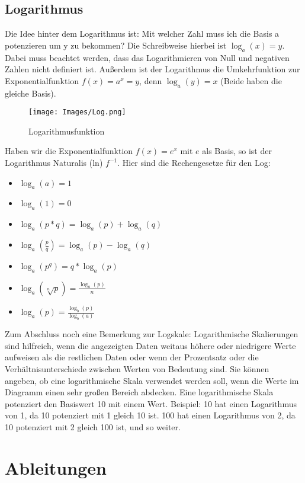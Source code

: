 \documentclass{scrreprt}
\begin{document}
\subsection{Logarithmus}\label{Logarithmus}
Die Idee hinter dem Logarithmus ist: Mit welcher Zahl muss ich die Basis a potenzieren um y zu bekommen?
Die Schreibweise hierbei ist $\log_a(x)=y$. Dabei muss beachtet werden, dass das Logarithmieren von Null und negativen Zahlen nicht definiert ist.
Außerdem ist der Logarithmus die Umkehrfunktion zur Exponentialfunktion $f(x)=a^x=y$, denn $\log_a(y)=x$ (Beide haben die gleiche Basis). 
\begin{figure}[h]
    \centering
    \texttt{[image: Images/Log.png]}
    \caption[L]{Logarithmusfunktion}
    \label{Figur 3}
\end{figure}
Haben wir die Exponentialfunktion $f(x)=e^x$ mit $e$ als Basis, so ist der Logarithmus Naturalis (ln) $f^{-1}$. Hier sind die Rechengesetze für den Log:\\
\begin{itemize}
    \item $\log_a(a)=1$
    \item $\log_a(1)=0$
    \item $\log_a(p*q)=\log_a(p)+\log_a(q)$
    \item $\log_a(\frac{p}{q})=\log_a(p)-\log_a(q)$
    \item $\log_a(p^q)=q*\log_a(p)$
    \item $\log_a(\sqrt[n]{p})=\frac{\log_a(p)}{n}$
    \item $\log_a(p)=\frac{\log_b(p)}{\log_b(a)}$
\end{itemize}
\vspace{0.6cm}
Zum Abschluss noch eine Bemerkung zur Logskale: Logarithmische Skalierungen sind hilfreich, wenn die angezeigten Daten weitaus höhere oder niedrigere Werte aufweisen als die restlichen Daten oder wenn der Prozentsatz oder die Verhältnisunterschiede zwischen Werten von Bedeutung sind.
Sie können angeben, ob eine logarithmische Skala verwendet werden soll, wenn die Werte im Diagramm einen sehr großen Bereich abdecken.
Eine logarithmische Skala potenziert den Basiswert 10 mit einem Wert. Beispiel: 10 hat einen Logarithmus von 1, da 10 potenziert mit 1 gleich 10 ist. 100 hat einen Logarithmus von 2, da 10 potenziert mit 2 gleich 100 ist, und so weiter.
%
\section{Ableitungen}\label{Ableitungen}
%
\end{document}
